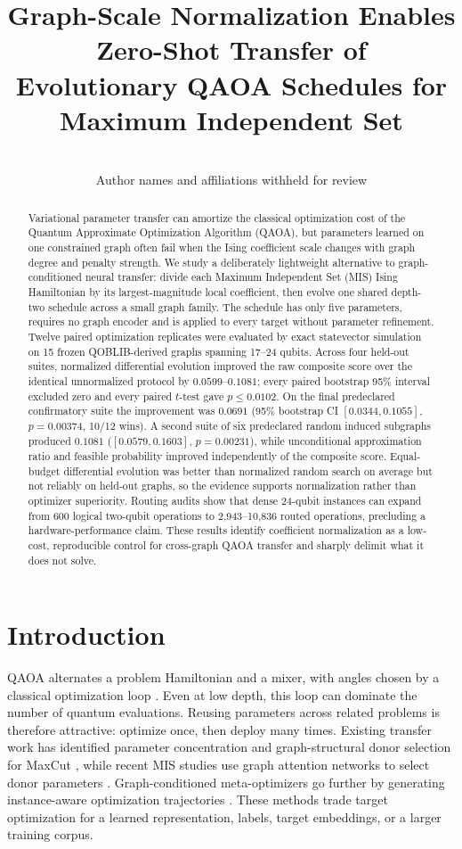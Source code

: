 \documentclass[10pt,twocolumn]{article}
\title{Graph-Scale Normalization Enables Zero-Shot Transfer of\\Evolutionary QAOA Schedules for Maximum Independent Set}
\author{\todoauthor\\\small Author names and affiliations withheld for review}
\date{}
\begin{document}
\maketitle

\begin{abstract}
Variational parameter transfer can amortize the classical optimization cost of the Quantum Approximate Optimization Algorithm (QAOA), but parameters learned on one constrained graph often fail when the Ising coefficient scale changes with graph degree and penalty strength. We study a deliberately lightweight alternative to graph-conditioned neural transfer: divide each Maximum Independent Set (MIS) Ising Hamiltonian by its largest-magnitude local coefficient, then evolve one shared depth-two schedule across a small graph family. The schedule has only five parameters, requires no graph encoder and is applied to every target without parameter refinement. Twelve paired optimization replicates were evaluated by exact statevector simulation on 15 frozen QOBLIB-derived graphs spanning 17--24 qubits. Across four held-out suites, normalized differential evolution improved the raw composite score over the identical unnormalized protocol by $0.0599$--$0.1081$; every paired bootstrap 95\% interval excluded zero and every paired $t$-test gave $p\leq0.0102$. On the final predeclared confirmatory suite the improvement was $0.0691$ (95\% bootstrap CI $[0.0344,0.1055]$, $p=0.00374$, 10/12 wins). A second suite of six predeclared random induced subgraphs produced $0.1081$ ($[0.0579,0.1603]$, $p=0.00231$), while unconditional approximation ratio and feasible probability improved independently of the composite score. Equal-budget differential evolution was better than normalized random search on average but not reliably on held-out graphs, so the evidence supports normalization rather than optimizer superiority. Routing audits show that dense 24-qubit instances can expand from 600 logical two-qubit operations to 2,943--10,836 routed operations, precluding a hardware-performance claim. These results identify coefficient normalization as a low-cost, reproducible control for cross-graph QAOA transfer and sharply delimit what it does not solve.
\end{abstract}

\section{Introduction}

QAOA alternates a problem Hamiltonian and a mixer, with angles chosen by a classical optimization loop \cite{farhi2014qaoa}. Even at low depth, this loop can dominate the number of quantum evaluations. Reusing parameters across related problems is therefore attractive: optimize once, then deploy many times. Existing transfer work has identified parameter concentration and graph-structural donor selection for MaxCut \cite{galda2023similarity,falla2024graph}, while recent MIS studies use graph attention networks to select donor parameters \cite{xu2025gat}. Graph-conditioned meta-optimizers go further by generating instance-aware optimization trajectories \cite{nguyen2026meta}. These methods trade target optimization for a learned representation, labels, target embeddings, or a larger training corpus.
\end{document}
